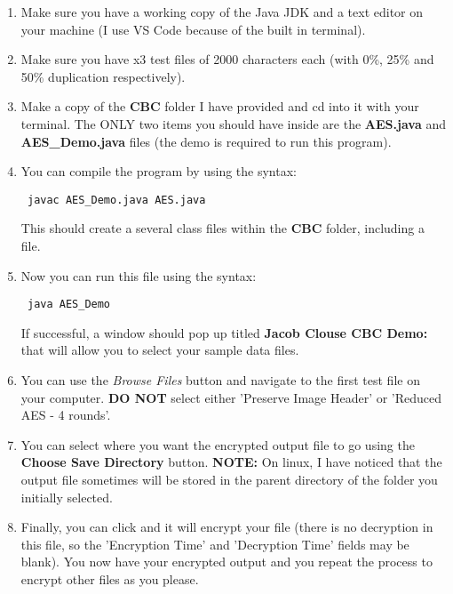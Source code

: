 \documentclass[10pt]{article}
\begin{document}
\begin{enumerate}
	\item Make sure you have a working copy of the Java JDK and a text editor on your machine (I use VS Code because of the built in terminal).
	
	\item Make sure you have x3 test files of 2000 characters each (with 0\%, 25\% and 50\% duplication respectively).
	
	\item Make a copy of the \textbf{CBC} folder I have provided and cd into it with your terminal. The ONLY two items you should have inside are the \textbf{AES.java} and \textbf{AES\_Demo.java} files (the demo is required to run this program).
	
	\item You can compile the program by using the syntax: \begin{verbatim} javac AES_Demo.java AES.java \end{verbatim}
	This should create a several class files within the \textbf{CBC} folder, including a  file.
	
	\item Now you can run this file using the syntax: 
	\begin{verbatim} java AES_Demo \end{verbatim} 
	If successful, a window should pop up titled \textbf{Jacob Clouse CBC Demo:} that will allow you to select your sample data files. 
	
	\item You can use the \textit{Browse Files} button and navigate to the first test file on your computer. \textbf{DO NOT} select either 'Preserve Image Header' or 'Reduced AES - 4 rounds'. 
	
	\item You can select where you want the encrypted output file to go using the \textbf{Choose Save Directory} button. \textbf{NOTE:} On linux, I have noticed that the output file sometimes will be stored in the parent directory of the folder you initially selected. 
	
	\item Finally, you can click  and it will encrypt your file (there is no decryption in this file, so the 'Encryption Time' and  'Decryption Time' fields may be blank). You now have your encrypted output and you repeat the process to encrypt other files as you please.

\end{enumerate}
\end{document}
